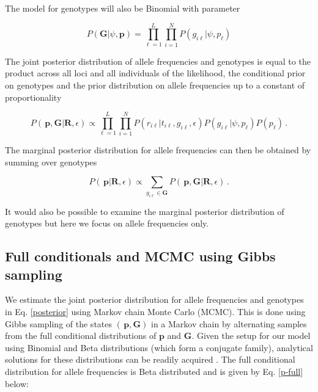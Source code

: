\documentclass[11pt,english,letterpaper,oneside]{article}
\begin{document}
The model for genotypes will also be Binomial with parameter

\begin{equation}\label{condl_prior}
P(\bm{G}|\psi, \bm{p}) = \displaystyle\prod_{\ell=1}^L\displaystyle\prod_{i=1}^N P(g_{i \ell}|\psi, p_{\ell})
\end{equation}

The joint posterior distribution of allele frequencies and genotypes is equal to the product across all loci and all individuals of the likelihood, the conditional prior on genotypes and the prior distribution on allele frequencies up to a constant of proportionality

\begin{equation}\label{posterior}
{P}(\,\bm{p},\bm{G}|\bm{R},\epsilon) \propto \displaystyle\prod_{\ell=1}^L\displaystyle\prod_{i=1}^N {P}(r_{i \ell}|t_{i\ell}, g_{i \ell},\epsilon){P}(g_{i \ell}|\psi, p_{\ell}){P}(p_{\ell})\,.
\end{equation}

\noindent The marginal posterior distribution for allele frequencies can then be obtained by summing over genotypes

\begin{equation}\label{marg_post_p}
{P}(\,\bm{p}|\bm{R},\epsilon) \propto \displaystyle\sum_{g_{i \ell}\in\bm{G}} {P}(\,\bm{p},\bm{G}|\bm{R},\epsilon)\,.
\end{equation}

\noindent It would also be possible to examine the marginal posterior distribution of genotypes but here we focus on allele frequencies only.

\medskip
\subsection*{Full conditionals and MCMC using Gibbs sampling}
\medskip

\noindent We estimate the joint posterior distribution for allele frequencies and genotypes in Eq. \ref{posterior} using Markov chain Monte Carlo (MCMC). This is done using Gibbs sampling of the states $(\,\bm{p},\bm{G})$ in a Markov chain by alternating samples from the full conditional distributions of $\bm{p}$ and $\bm{G}$. Given the setup for our model using Binomial and Beta distributions (which form a conjugate family), analytical solutions for these distributions can be readily acquired \citep{gelman2014bayesian}. The full conditional distribution for allele frequencies is Beta distributed and is given by Eq. \ref{p-full} below:
\end{document}
